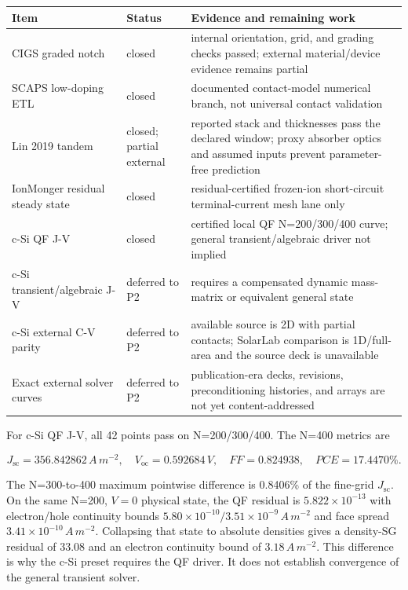 \documentclass[
  11pt,
  american,
]{report}
\begin{document}
\begin{longtable}[]{@{}
  >{\raggedright\arraybackslash}p{}
  >{\raggedright\arraybackslash}p{}
  >{\raggedright\arraybackslash}p{}@{}}
\toprule
Item & Status & Evidence and remaining work \\
\midrule
\endhead
CIGS graded notch & closed & internal orientation, grid, and grading
checks passed; external material/device evidence remains partial \\
SCAPS low-doping ETL & closed & documented contact-model numerical
branch, not universal contact validation \\
Lin 2019 tandem & closed; partial external & reported stack and
thicknesses pass the declared window; proxy absorber optics and assumed
inputs prevent parameter-free prediction \\
IonMonger residual steady state & closed & residual-certified frozen-ion
short-circuit terminal-current mesh lane only \\
c-Si QF J-V & closed & certified local QF N=200/300/400 curve; general
transient/algebraic driver not implied \\
c-Si transient/algebraic J-V & deferred to P2 & requires a compensated
dynamic mass-matrix or equivalent general state \\
c-Si external C-V parity & deferred to P2 & available source is 2D with
partial contacts; SolarLab comparison is 1D/full-area and the source
deck is unavailable \\
Exact external solver curves & deferred to P2 & publication-era decks,
revisions, preconditioning histories, and arrays are not yet
content-addressed \\
\bottomrule
\end{longtable}

For c-Si QF J-V, all 42 points pass on N=200/300/400. The N=400 metrics
are

\[
J_\mathrm{sc}=356.842862\,A\,m^{-2},\quad
V_\mathrm{oc}=0.592684\,V,\quad
FF=0.824938,\quad PCE=17.4470\%.
\]

The N=300-to-400 maximum pointwise difference is 0.8406\% of the
fine-grid \(J_\mathrm{sc}\). On the same N=200, \(V=0\) physical state,
the QF residual is \(5.822\times10^{-13}\) with electron/hole continuity
bounds \(5.80\times10^{-10}/3.51\times10^{-9}\,A\,m^{-2}\) and face
spread \(3.41\times10^{-10}\,A\,m^{-2}\). Collapsing that state to
absolute densities gives a density-SG residual of 33.08 and an electron
continuity bound of \(3.18\,A\,m^{-2}\). This difference is why the c-Si
preset requires the QF driver. It does not establish convergence of the
general transient solver.
\end{document}
